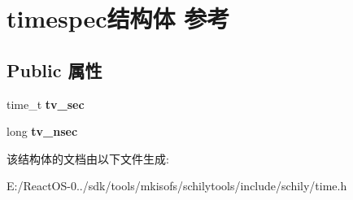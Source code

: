 \hypertarget{structtimespec}{}\section{timespec结构体 参考}
\label{structtimespec}
\subsection*{Public 属性}
\begin{DoxyCompactItemize}
\item 
\mbox{\label{structtimespec_afc3302668d7cb5952f590da69fdd4955}} 
time\+\_\+t {\bfseries tv\+\_\+sec}
\item 
\mbox{\label{structtimespec_ae3c7510dafa8cbcaede866ed13c99683}} 
long {\bfseries tv\+\_\+nsec}
\end{DoxyCompactItemize}


该结构体的文档由以下文件生成\+:\begin{DoxyCompactItemize}
\item 
E\+:/\+React\+O\+S-\/0../sdk/tools/mkisofs/schilytools/include/schily/time.\+h\end{DoxyCompactItemize}
